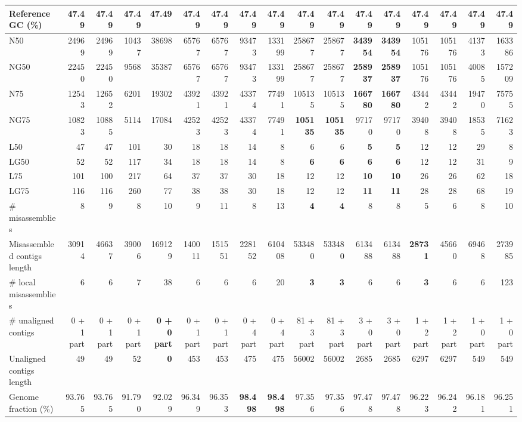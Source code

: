 \documentclass[12pt,a4paper]{article}
\begin{document}
\begin{table}[ht]
\begin{center}
\begin{tabular}{|l*{16}{|r}|}
Reference GC (\%) & 47.49 & 47.49 & 47.49 & 47.49 & 47.49 & 47.49 & 47.49 & 47.49 & 47.49 & 47.49 & 47.49 & 47.49 & 47.49 & 47.49 & 47.49 & 47.49 \\ \hline
N50 & 24969 & 24969 & 10437 & 38698 & 65767 & 65767 & 93473 & 133199 & 258677 & 258677 & {\bf 343954} & {\bf 343954} & 105176 & 105176 & 41373 & 163386 \\ \hline
NG50 & 22450 & 22450 & 9568 & 35387 & 65767 & 65767 & 93473 & 133199 & 258677 & 258677 & {\bf 258937} & {\bf 258937} & 105176 & 105176 & 40085 & 157209 \\ \hline
N75 & 12543 & 12652 & 6201 & 19302 & 43921 & 43921 & 43374 & 77491 & 105135 & 105135 & {\bf 166780} & {\bf 166780} & 43442 & 43442 & 19470 & 75755 \\ \hline
NG75 & 10823 & 10885 & 5114 & 17084 & 42523 & 42523 & 43374 & 77491 & {\bf 105135} & {\bf 105135} & 97170 & 97170 & 39408 & 39408 & 18535 & 71623 \\ \hline
L50 & 47 & 47 & 101 & 30 & 18 & 18 & 14 & 8 & 6 & 6 & {\bf 5} & {\bf 5} & 12 & 12 & 29 & 8 \\ \hline
LG50 & 52 & 52 & 117 & 34 & 18 & 18 & 14 & 8 & {\bf 6} & {\bf 6} & {\bf 6} & {\bf 6} & 12 & 12 & 31 & 9 \\ \hline
L75 & 101 & 100 & 217 & 64 & 37 & 37 & 30 & 18 & 12 & 12 & {\bf 10} & {\bf 10} & 26 & 26 & 62 & 18 \\ \hline
LG75 & 116 & 116 & 260 & 77 & 38 & 38 & 30 & 18 & 12 & 12 & {\bf 11} & {\bf 11} & 28 & 28 & 68 & 19 \\ \hline
\# misassemblies & 8 & 9 & 8 & 10 & 9 & 11 & 8 & 13 & {\bf 4} & {\bf 4} & 8 & 8 & 5 & 6 & 8 & 10 \\ \hline
Misassembled contigs length & 30914 & 46637 & 39006 & 169129 & 140011 & 151551 & 228152 & 610408 & 533480 & 533480 & 613488 & 613488 & {\bf 28731} & 45660 & 69468 & 273985 \\ \hline
\# local misassemblies & 6 & 6 & 7 & 38 & 6 & 6 & 6 & 20 & {\bf 3} & {\bf 3} & 6 & 6 & {\bf 3} & 6 & 6 & 123 \\ \hline
\# unaligned contigs & 0 + 1 part & 0 + 1 part & 0 + 1 part & {\bf 0 + 0 part} & 0 + 1 part & 0 + 1 part & 0 + 4 part & 0 + 4 part & 81 + 3 part & 81 + 3 part & 3 + 0 part & 3 + 0 part & 1 + 2 part & 1 + 2 part & 1 + 0 part & 1 + 0 part \\ \hline
Unaligned contigs length & 49 & 49 & 52 & {\bf 0} & 453 & 453 & 475 & 475 & 56002 & 56002 & 2685 & 2685 & 6297 & 6297 & 549 & 549 \\ \hline
Genome fraction (\%) & 93.765 & 93.765 & 91.790 & 92.029 & 96.349 & 96.353 & {\bf 98.498} & {\bf 98.498} & 97.356 & 97.356 & 97.478 & 97.478 & 96.223 & 96.242 & 96.181 & 96.251 \\ \hline

\end{tabular}
\end{center}
\end{table}
\end{document}
